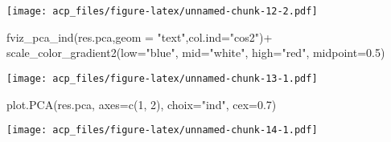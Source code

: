 \documentclass[
]{article}
\newenvironment{Shaded}{\begin{snugshade}}{\end{snugshade}}
\newcommand{\AttributeTok}[1]{\textcolor[rgb]{0.77,0.63,0.00}{#1}}
\newcommand{\DecValTok}[1]{\textcolor[rgb]{0.00,0.00,0.81}{#1}}
\newcommand{\FloatTok}[1]{\textcolor[rgb]{0.00,0.00,0.81}{#1}}
\newcommand{\FunctionTok}[1]{\textcolor[rgb]{0.00,0.00,0.00}{#1}}
\newcommand{\NormalTok}[1]{#1}
\newcommand{\SpecialCharTok}[1]{\textcolor[rgb]{0.00,0.00,0.00}{#1}}
\newcommand{\StringTok}[1]{\textcolor[rgb]{0.31,0.60,0.02}{#1}}
\begin{document}
\texttt{[image: acp\_files/figure-latex/unnamed-chunk-12-2.pdf]}

\begin{Shaded}
\begin{Highlighting}[]
\FunctionTok{fviz\_pca\_ind}\NormalTok{(res.pca,}\AttributeTok{geom =} \StringTok{"text"}\NormalTok{,}\AttributeTok{col.ind=}\StringTok{"cos2"}\NormalTok{)}\SpecialCharTok{+}
\FunctionTok{scale\_color\_gradient2}\NormalTok{(}\AttributeTok{low=}\StringTok{"blue"}\NormalTok{, }\AttributeTok{mid=}\StringTok{"white"}\NormalTok{, }
                      \AttributeTok{high=}\StringTok{"red"}\NormalTok{, }\AttributeTok{midpoint=}\FloatTok{0.5}\NormalTok{)}
\end{Highlighting}
\end{Shaded}

\texttt{[image: acp\_files/figure-latex/unnamed-chunk-13-1.pdf]}

\begin{Shaded}
\begin{Highlighting}[]
\FunctionTok{plot.PCA}\NormalTok{(res.pca, }\AttributeTok{axes=}\FunctionTok{c}\NormalTok{(}\DecValTok{1}\NormalTok{, }\DecValTok{2}\NormalTok{), }\AttributeTok{choix=}\StringTok{"ind"}\NormalTok{, }\AttributeTok{cex=}\FloatTok{0.7}\NormalTok{)}
\end{Highlighting}
\end{Shaded}

\texttt{[image: acp\_files/figure-latex/unnamed-chunk-14-1.pdf]}
\end{document}
